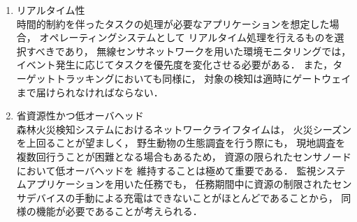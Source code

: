 \begin{enumerate}
\item{リアルタイム性}\\
時間的制約を伴ったタスクの処理が必要なアプリケーションを想定した場合，
オペレーティングシステムとして
リアルタイム処理を行えるものを選択すべきであり，
無線センサネットワークを用いた環境モニタリングでは，
イベント発生に応じてタスクを優先度を変化させる必要がある．
また，ターゲットトラッキングにおいても同様に，
対象の検知は適時にゲートウェイまで届けられなければならない．
\newline
\item{省資源性かつ低オーバヘッド}\\
森林火災検知システムにおけるネットワークライフタイムは，
火災シーズンを上回ることが望ましく，
野生動物の生態調査を行う際にも，
現地調査を複数回行うことが困難となる場合もあるため，
資源の限られたセンサノードにおいて低オーバヘッドを
維持することは極めて重要である．
監視システムアプリケーションを用いた任務でも，
任務期間中に資源の制限されたセンサデバイスの手動による充電はできないことがほとんどであることから，
同様の機能が必要であることが考えられる．
\end{enumerate}




